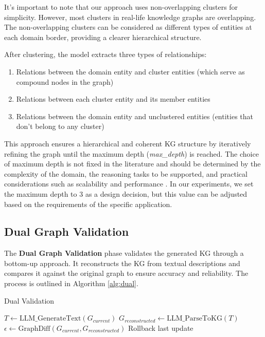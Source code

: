 \documentclass[11pt]{article}
\begin{document}
It's important to note that our approach uses non-overlapping clusters for simplicity. However, most clusters in real-life knowledge graphs are overlapping. The non-overlapping clusters can be considered as different types of entities at each domain border, providing a clearer hierarchical structure.

After clustering, the model extracts three types of relationships:
\begin{enumerate}
    \item Relations between the domain entity and cluster entities (which serve as compound nodes in the graph)
    \item Relations between each cluster entity and its member entities
    \item Relations between the domain entity and unclustered entities (entities that don't belong to any cluster)
\end{enumerate}

This approach ensures a hierarchical and coherent KG structure by iteratively refining the graph until the maximum depth (\textit{max\_depth}) is reached. The choice of maximum depth is not fixed in the literature and should be determined by the complexity of the domain, the reasoning tasks to be supported, and practical considerations such as scalability and performance \cite{ThinkOnGraph2024}. In our experiments, we set the maximum depth to 3 as a design decision, but this value can be adjusted based on the requirements of the specific application.

\subsection{Dual Graph Validation}

The \textbf{Dual Graph Validation} phase validates the generated KG through a bottom-up approach. It reconstructs the KG from textual descriptions and compares it against the original graph to ensure accuracy and reliability. The process is outlined in Algorithm \ref{alg:dual}.

\begin{algorithm}[H]
    \caption{Dual Validation}
    \label{alg:dual}
    \begin{algorithmic}[1]
        \State $T \gets \text{LLM\_GenerateText}(G_{current})$ 
        \State $G_{reconstructed} \gets \text{LLM\_ParseToKG}(T)$ 
        \State $\epsilon \gets \text{GraphDiff}(G_{current}, G_{reconstructed})$ 
        \State Rollback last update 
        \EndIf
    \end{algorithmic}
\end{algorithm}
\end{document}
